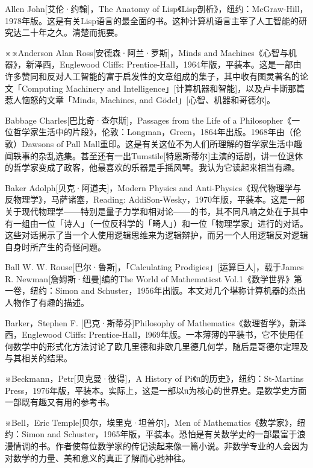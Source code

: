\documentclass[
  12pt,
  twoside,
  openright,
  oldfontcommands,
]{memoir}
\begin{document}
\hfill\break

Allen John{[}艾伦·约翰{]}，The Anatomy of
Lisp《Lisp剖析》，纽约：McGraw-Hill，1978年版。这是有关Lisp语言的最全面的书。这种计算机语言主宰了人工智能的研究达二十年之久。清楚而扼要。

※※Anderson Alan Ross{[}安德森·阿兰·罗斯{]}，Minds and
Machines《心智与机器》，新泽西，Englewood Cliffs:
Prentice-Hall，1964年版，平装本。这是一部由许多赞同和反对人工智能的富于启发性的文章组成的集子，其中收有图灵著名的论文「Computing
Machinery and
Intelligence」{[}计算机器和智能{]}，以及卢卡斯那篇惹人恼怒的文章「Minds,
Machines, and Gödel」{[}心智、机器和哥德尔{]}。

Babbage Charles{[}巴比奇·查尔斯{]}，Passages from the Life of a
Philosopher《一位哲学家生活中的片段》，伦敦：Longman，Green，1864年出版。1968年由（伦敦）Dawsons
of Pall
Mall重印。这是有关这位不为人们所理解的哲学家生活中趣闻轶事的杂乱选集。甚至还有一出Tumstile{[}特恩斯蒂尔{]}主演的话剧，讲一位退休的哲学家变成了政客，他最喜欢的乐器是手摇风琴。我认为它读起来相当有趣。

Baker Adolph{[}贝克·阿道夫{]}，Modern Physics and
Anti-Physics《现代物理学与反物理学》，马萨诸塞，Reading:
AddiSon-Wesky，1970年版，平装本。这是一部关于现代物理学------特别是量子力学和相对论------的书，其不同凡响之处在于其中有一组由一位「诗人」（一位反科学的「畸人」）和一位「物理学家」进行的对话。这些对话揭示了当一个人使用逻辑思维来为逻辑辩护，而另一个人用逻辑反对逻辑自身时所产生的奇怪问题。

Ball W. W. Rouse{[}巴尔·鲁斯{]}，「Calculating
Prodigies」{[}运算巨人{]}，载于James R. Newman{[}詹姆斯·纽曼{]}编的The
World of Mathematicst Vol.1《数学世界》第一卷，纽约：Simon and
Schuster，1956年出版。本文对几个堪称计算机器的杰出人物作了有趣的描述。

Barker，Stephen F. {[}巴克·斯蒂芬{]}Philosophy of
Mathematics《数理哲学》，新泽西，Englewood Cliffs:
Prentice-Hall，l969年版。一本薄薄的平装书，它不使用任何数学中的形式化方法讨论了欧几里德和非欧几里德几何学，随后是哥德尔定理及与其相关的结果。

※Beckmann，Petr{[}贝克曼·彼得{]}，A History of
Pi《π的历史》，纽约：St-Martin\textquotesingle s
Press，1976年版，平装本。实际上，这是一部以π为核心的世界史。是数学史方面一部既有趣又有用的参考书。

※Bell，Eric Temple{[}贝尔，埃里克·坦普尔{]}，Men of
Mathematics《数学家》，纽约：Simon and
Schuster，1965年版，平装本。恐怕是有关数学史的一部最富于浪漫情调的书。作者使每位数学家的传记读起来像一篇小说。非数学专业的人会因为对数学的力量、美和意义的真正了解而心驰神往。
\end{document}
